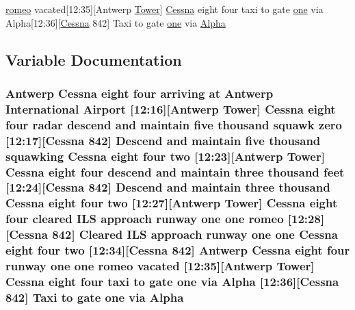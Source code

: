 \begin{DoxyCompactItemize}
\hyperlink{happyDay4ExpectedATC_8txt_a675cfa5c76a2ab697663f72c9d4e8c9a}{romeo} vacated\mbox{[}12\+:35\mbox{]}\mbox{[}Antwerp \hyperlink{test_2testOutput_2log_8txt_ade5c2a9317c664c53d015e41bdc32393}{Tower}\mbox{]} \hyperlink{test_2testOutput_2log_8txt_a3de326468ae3f37941c91ae68853a1af}{Cessna} eight four taxi to gate \hyperlink{happyDay5ExpectedATC_8txt_a1bdf675837626f29e859d1a241701d26}{one} via Alpha\mbox{[}12\+:36\mbox{]}\mbox{[}\hyperlink{test_2testOutput_2log_8txt_a3de326468ae3f37941c91ae68853a1af}{Cessna} 842\mbox{]} Taxi to gate \hyperlink{happyDay5ExpectedATC_8txt_a1bdf675837626f29e859d1a241701d26}{one} via \hyperlink{happyDay1ExpectedATC_8txt_a8a98f161ea590d9e60554c1f88b29a00}{Alpha}
\end{DoxyCompactItemize}


\subsection{Variable Documentation}
\subsubsection[{\texorpdfstring{Alpha}{Alpha}}]{\setlength{\rightskip}{0pt plus 5cm}Antwerp {\bf Cessna} eight four arriving at Antwerp International {\bf Airport} \mbox{[}12\+:16\mbox{]}\mbox{[}Antwerp {\bf Tower}\mbox{]} {\bf Cessna} eight four radar descend and maintain five {\bf thousand} squawk {\bf zero} \mbox{[}12\+:17\mbox{]}\mbox{[}{\bf Cessna} 842\mbox{]} Descend and maintain five {\bf thousand} {\bf squawking} {\bf Cessna} eight four {\bf two} \mbox{[}12\+:23\mbox{]}\mbox{[}Antwerp {\bf Tower}\mbox{]} {\bf Cessna} eight four descend and maintain three {\bf thousand} {\bf feet} \mbox{[}12\+:24\mbox{]}\mbox{[}{\bf Cessna} 842\mbox{]} Descend and maintain three {\bf thousand} {\bf Cessna} eight four {\bf two} \mbox{[}12\+:27\mbox{]}\mbox{[}Antwerp {\bf Tower}\mbox{]} {\bf Cessna} eight four cleared I\+LS approach runway {\bf one} {\bf one} {\bf romeo} \mbox{[}12\+:28\mbox{]}\mbox{[}{\bf Cessna} 842\mbox{]} Cleared I\+LS approach runway {\bf one} {\bf one} {\bf Cessna} eight four {\bf two} \mbox{[}12\+:34\mbox{]}\mbox{[}{\bf Cessna} 842\mbox{]} Antwerp {\bf Cessna} eight four runway {\bf one} {\bf one} {\bf romeo} vacated \mbox{[}12\+:35\mbox{]}\mbox{[}Antwerp {\bf Tower}\mbox{]} {\bf Cessna} eight four taxi to gate {\bf one} via Alpha \mbox{[}12\+:36\mbox{]}\mbox{[}{\bf Cessna} 842\mbox{]} Taxi to gate {\bf one} via Alpha}\hypertarget{happyDay1ExpectedATC_8txt_a8a98f161ea590d9e60554c1f88b29a00}{}\label{happyDay1ExpectedATC_8txt_a8a98f161ea590d9e60554c1f88b29a00}
